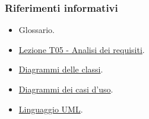\subsubsection{Riferimenti informativi}
\begin{itemize}
    \item Glossario.
    \item \href{https://www.math.unipd.it/~tullio/IS-1/2023/Dispense/T5.pdf}{Lezione T05 - Analisi dei requisiti}.
    \item \href{https://www.math.unipd.it/~rcardin/swea/2023/Diagrammi%20delle%20Classi.pdf}{Diagrammi delle classi}.
    \item \href{https://www.math.unipd.it/~rcardin/swea/2022/Diagrammi%20Use%20Case.pdf}{Diagrammi dei casi d'uso}.
    \item \href{https://bsituos.weebly.com/uploads/2/5/2/5/25253721/applying-uml-and-patterns-3rd.pdf}{Linguaggio UML}.
\end{itemize}
